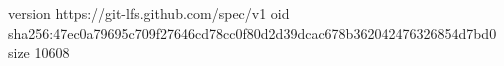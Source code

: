 version https://git-lfs.github.com/spec/v1
oid sha256:47ec0a79695c709f27646cd78cc0f80d2d39dcac678b362042476326854d7bd0
size 10608
